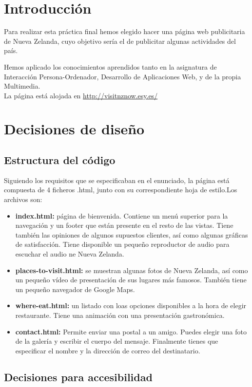 \section{Introducción}
Para realizar esta práctica final hemos elegido hacer una página web publicitaria de Nueva Zelanda, cuyo objetivo sería el de publicitar algunas actividades del país.

Hemos aplicado los conocimientos aprendidos tanto en la asignatura de Interacción Persona-Ordenador, Desarrollo de Aplicaciones Web, y de la propia Multimedia.\\

La página está alojada en \href{http://visitnznow.esy.es/}{http://visitnznow.esy.es/}
\section{Decisiones de diseño}
\subsection{Estructura del código}
Siguiendo los requisitos que se especificaban en el enunciado, la página está compuesta de 4 ficheros .html, junto con su correspondiente hoja de estilo.Los archivos son:
\begin{itemize}
	\item \textbf{index.html: }página de bienvenida. Contiene un menú superior para la navegación y un footer que están presente en el resto de las vistas. Tiene también las opiniones de algunos supuestos clientes, así como algunas gráficas de satisfacción. Tiene disponible un pequeño reproductor de audio para escuchar el audio ne Nueva Zelanda. 
	\item \textbf{places-to-visit.html: } se muestran algunas fotos de Nueva Zelanda, así como un pequeño vídeo de presentación de sus lugares más famosos. También tiene un pequeño navegador de Google Maps.
	\item \textbf{where-eat.html: }un listado con loas opciones disponibles a la hora de elegir restaurante. Tiene una animación con una presentación gastronómica.
	\item \textbf{contact.html: }Permite enviar una postal a un amigo. Puedes elegir una foto de la galería y escribir el cuerpo del mensaje. Finalmente tienes que especificar el nombre y la dirección de correo del destinatario.
\end{itemize}

\subsection{Decisiones para accesibilidad}

